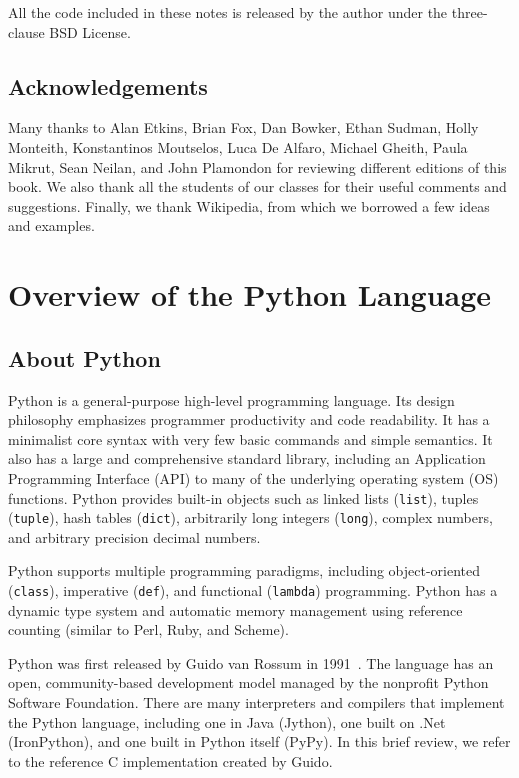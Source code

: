 \documentclass[justified, sixbynine]{tufte-book}
\def\ft{\small\tt}
\theoremstyle{plain}%
\newtheorem * {corollary}{Corollary}
\theoremstyle{definition}
\theoremstyle{remark}
\newtheorem * {remark}{Remark}
\newtheorem * {note}{Note}
\begin{document}
\begin{fullwidth}
All the code included in these notes is released by the author under the three-clause BSD License.

\section * {Acknowledgements}

Many thanks to Alan Etkins, Brian Fox, Dan Bowker, Ethan Sudman, Holly Monteith, Konstantinos Moutselos, Luca De Alfaro, Michael Gheith, Paula Mikrut, Sean Neilan, and John Plamondon for reviewing different editions of this book. We also thank all the students of our classes for their useful comments and suggestions. Finally, we thank Wikipedia, from which we borrowed a few ideas and examples.

\goodbreak\chapter{Overview of the Python Language}


\goodbreak\section{About Python}

Python is a general-purpose high-level programming language.
Its design philosophy emphasizes programmer productivity and code readability. It has a minimalist core syntax with very few basic commands and simple semantics. It also has a large and comprehensive standard library, including an Application Programming Interface (API)  to many of the underlying operating system (OS) functions. Python provides built-in objects such as linked lists ({\ft list}), tuples ({\ft tuple}), hash tables ({\ft dict}), arbitrarily long integers ({\ft long}), complex numbers, and arbitrary precision decimal numbers.

Python supports multiple programming paradigms, including object-oriented ({\ft class}), imperative ({\ft def}), and functional ({\ft lambda}) programming. Python has a dynamic type system and automatic memory management using reference counting (similar to Perl, Ruby, and Scheme).

Python was first released by Guido van Rossum in 1991~\cite{guido}. The language has an open, community-based development model managed by the nonprofit Python Software Foundation. There are many interpreters and compilers that implement the Python language, including one in Java (Jython), one built on .Net (IronPython), and one built in Python itself (PyPy). In this brief review, we refer to the reference C implementation created by Guido.


\end{fullwidth}
\end{document}
